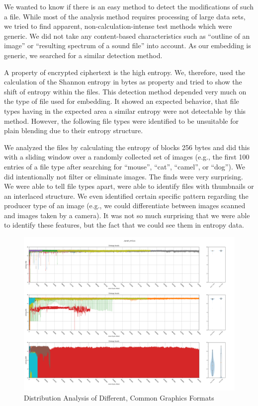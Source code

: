 We wanted to know if there is an easy method to detect the modifications of such a file. While most of the analysis method requires processing of large data sets, we tried to find apparent, non-calculation-intense test methods which were generic. We did not take any content-based characteristics such as ``outline of an image'' or ``resulting spectrum of a sound file'' into account. As our embedding is generic, we searched for a similar detection method.

A property of encrypted ciphertext is the high entropy. We, therefore, used the calculation of the Shannon entropy in bytes as property and tried to show the shift of entropy within the files. This detection method depended very much on the type of file used for embedding. It showed an expected behavior, that file types having in the expected area a similar entropy were not detectable by this method. However, the following file types were identified to be unsuitable for plain blending due to their entropy structure.

We analyzed the files by calculating the entropy of blocks 256 bytes and did this with a sliding window over a randomly collected set of images (e.g., the first 100 entries of a file type after searching for ``mouse'', ``cat'', ``camel'', or ``dog''). We did intentionally not filter or eliminate images. The finds were very surprising. We were able to tell file types apart, were able to identify files with thumbnails or an interlaced structure. We even identified certain specific pattern regarding the producer type of an image (e.g., we could differentiate between images scanned and images taken by a camera). It was not so much surprising that we were able to identify these features, but the fact that we could see them in entropy data.

\begin{figure}[ht]
	\includegraphics[width=\textwidth]{inc/statanalysis_graph}
	\caption{Distribution Analysis of Different, Common Graphics Formats}
	\label{fig:statGraph}
\end{figure}

